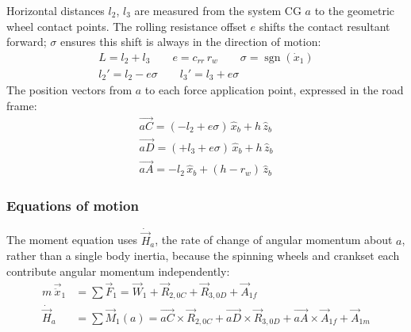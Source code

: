 \documentclass[10pt]{extarticle}
\numberwithin{equation}{subsubsection}
\newcommand{\sgn}{\operatorname{sgn}}
\begin{document}
Horizontal distances $l_2$, $l_3$ are measured from the system CG $a$ to the geometric wheel contact points. The rolling resistance offset $e$ shifts the contact resultant forward; $\sigma$ ensures this shift is always in the direction of motion:
\begin{gather}
    L = l_2 + l_3 \qquad e = c_{rr}\,r_w \qquad \sigma = \sgn(\dot{x}_1) \\
    l_2' = l_2 - e\sigma \qquad l_3' = l_3 + e\sigma
\end{gather}
The position vectors from $a$ to each force application point, expressed in the road frame:
\begin{gather}
    \vec{aC} = (-l_2 + e\sigma)\,\hat{x}_b + h\,\hat{z}_b \\
    \vec{aD} = (+l_3 + e\sigma)\,\hat{x}_b + h\,\hat{z}_b \\
    \vec{aA} = -l_2\,\hat{x}_b + (h - r_w)\,\hat{z}_b
\end{gather}

\subsubsection{Equations of motion}

The moment equation uses $\dot{\vec{H}}_a$, the rate of change of angular momentum about $a$, rather than a single body inertia, because the spinning wheels and crankset each contribute angular momentum independently:
\begin{align}
    m\,\vec{\ddot{x}}_1 &= \sum \vec{F}_1 = \vec{W}_1 + \vec{R}_{2,0C} + \vec{R}_{3,0D} + \vec{A}_{1f} \\[6pt]
    \dot{\vec{H}}_a &= \sum \vec{M}_1(a) = \vec{aC}\times\vec{R}_{2,0C} + \vec{aD}\times\vec{R}_{3,0D} + \vec{aA}\times\vec{A}_{1f} + \vec{A}_{1m}
\end{align}
\end{document}
